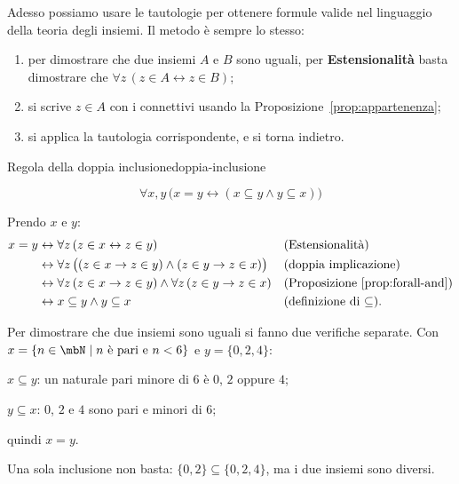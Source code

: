 Adesso possiamo usare le tautologie per ottenere formule valide nel linguaggio della teoria degli insiemi.
Il metodo è sempre lo stesso:
\begin{enumerate}
    \item per dimostrare che due insiemi $A$ e $B$ sono uguali, per \textbf{Estensionalità} basta dimostrare
          che $\forall z\,(z \in A \leftrightarrow z \in B)$;
    \item si scrive $z \in A$ con i connettivi usando la Proposizione~\ref{prop:appartenenza};
    \item si applica la tautologia corrispondente, e si torna indietro.
\end{enumerate}

\begin{concetto}
\begin{Proposizione}{Regola della doppia inclusione}{doppia-inclusione}
    \begin{prerequisiti}
    \end{prerequisiti}
    \[ \forall x, y\,\big(x = y \leftrightarrow (x \subseteq y \wedge y \subseteq x)\big) \]
\end{Proposizione}
\begin{dimostrazione}
    Prendo $x$ e $y$:
    \[
    \begin{aligned}
        x = y &\leftrightarrow \forall z\,(z \in x \leftrightarrow z \in y) && \text{(Estensionalità)}\\
        &\leftrightarrow \forall z\,\big((z \in x \rightarrow z \in y) \wedge (z \in y \rightarrow z \in x)\big) && \text{(doppia implicazione)}\\
        &\leftrightarrow \forall z\,(z \in x \rightarrow z \in y) \wedge \forall z\,(z \in y \rightarrow z \in x) && \text{(Proposizione~\ref{prop:forall-and})}\\
        &\leftrightarrow x \subseteq y \wedge y \subseteq x && \text{(definizione di $\subseteq$)}.
    \end{aligned}
    \]
\end{dimostrazione}
\end{concetto}

\begin{spiegazione}
    Per dimostrare che due insiemi sono uguali si fanno due verifiche separate. Con $x = \{n \in \mbN \mid n \text{ è pari e } n < 6\}$ e $y = \{0, 2, 4\}$:
    \begin{passi}
        \item $x \subseteq y$: un naturale pari minore di $6$ è $0$, $2$ oppure $4$;
        \item $y \subseteq x$: $0$, $2$ e $4$ sono pari e minori di $6$;
        \item quindi $x = y$.
    \end{passi}
    Una sola inclusione non basta: $\{0, 2\} \subseteq \{0, 2, 4\}$, ma i due insiemi sono diversi.
\end{spiegazione}


